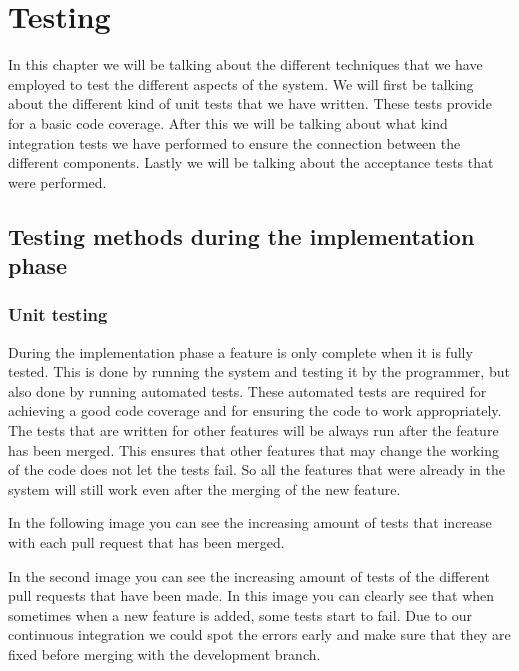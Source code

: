 \chapter{Testing}
In this chapter we will be talking about the different techniques that we have employed to test the different aspects of the system.
We will first be talking about the different kind of unit tests that we have written.
These tests provide for a basic code coverage.
After this we will be talking about what kind integration tests we have performed to ensure the connection between the different components.
Lastly we will be talking about the acceptance tests that were performed.

\section{Testing methods during the implementation phase}
\subsection{Unit testing}
During the implementation phase a feature is only complete when it is fully tested.
This is done by running the system and testing it by the programmer, but also done by running automated tests.
These automated tests are required for achieving a good code coverage and for ensuring the code to work appropriately.
The tests that are written for other features will be always run after the feature has been merged.
This ensures that other features that may change the working of the code does not let the tests fail.
So all the features that were already in the system will still work even after the merging of the new feature.

In the following image you can see the increasing amount of tests that increase with each pull request that has been merged.

In the second image you can see the increasing amount of tests of the different pull requests that have been made.
In this image you can clearly see that when sometimes when a new feature is added, some tests start to fail.
Due to our continuous integration we could spot the errors early and make sure that they are fixed before merging with the development branch.

